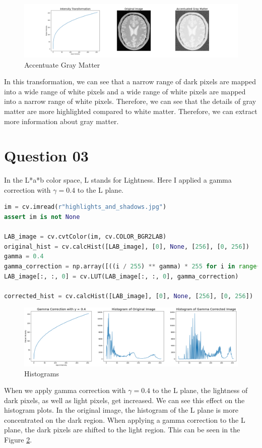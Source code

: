 \documentclass[a4paper]{article}
\begin{document}
\begin{figure}[!htb]
    \centering
    \hspace*{-2cm}
    \includegraphics[width=1.2\textwidth]{../q22.png}
    \caption{Accentuate Gray Matter}
    \label{figq22}
\end{figure}

In this transformation, we can see that a narrow range of dark pixels
 are mapped into a wide range of white pixels and a wide range of white
  pixels are mapped into a narrow range of white pixels. Therefore,
   we can see that the details of gray matter are more highlighted 
   compared to white matter. Therefore, we can extract more information about
    gray matter.

\section*{Question 03}
In the L*a*b color space, L stands for Lightness. Here I applied a gamma correction with
 $\gamma = 0.4$ to the L plane.
\begin{lstlisting}[language=python, caption={Gamma Correction with $\gamma =0.4$} ]
im = cv.imread(r"highlights_and_shadows.jpg")
assert im is not None

LAB_image = cv.cvtColor(im, cv.COLOR_BGR2LAB)
original_hist = cv.calcHist([LAB_image], [0], None, [256], [0, 256])
gamma = 0.4
gamma_correction = np.array([((i / 255) ** gamma) * 255 for i in range(0,256)],dtype=np.uint8)
LAB_image[:, :, 0] = cv.LUT(LAB_image[:, :, 0], gamma_correction)

corrected_hist = cv.calcHist([LAB_image], [0], None, [256], [0, 256])
\end{lstlisting}

\begin{figure}[!htb]
    \centering

    \includegraphics[width=\textwidth]{../q31.png}
    \caption{Histograms}
    \label{figq31}
\end{figure}
When we apply gamma
 correction with $\gamma = 0.4$ to the L plane, the lightness of dark pixels, as well
  as light pixels, get increased.  We can see this effect on the histogram plots. In the
 original image, the histogram of the L plane is more concentrated on
  the dark region. When applying a gamma correction to the L plane, the dark pixels are shifted 
to the light region. This can be seen in the Figure \ref{figq31}.
\end{document}
